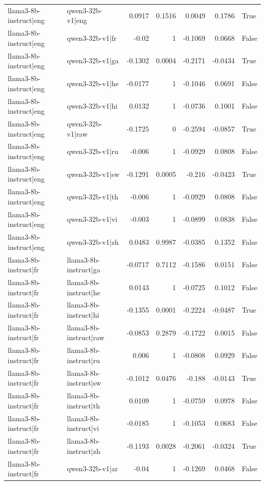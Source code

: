 \begin{table}
\begin{tabular}{l l r r r r l}
llama3-8b-instruct|eng & qwen3-32b-v1|eng & 0.0917 & 0.1516 & 0.0049 & 0.1786 & True \\
llama3-8b-instruct|eng & qwen3-32b-v1|fr & -0.02 & 1 & -0.1069 & 0.0668 & False \\
llama3-8b-instruct|eng & qwen3-32b-v1|ga & -0.1302 & 0.0004 & -0.2171 & -0.0434 & True \\
llama3-8b-instruct|eng & qwen3-32b-v1|he & -0.0177 & 1 & -0.1046 & 0.0691 & False \\
llama3-8b-instruct|eng & qwen3-32b-v1|hi & 0.0132 & 1 & -0.0736 & 0.1001 & False \\
llama3-8b-instruct|eng & qwen3-32b-v1|raw & -0.1725 & 0 & -0.2594 & -0.0857 & True \\
llama3-8b-instruct|eng & qwen3-32b-v1|ru & -0.006 & 1 & -0.0929 & 0.0808 & False \\
llama3-8b-instruct|eng & qwen3-32b-v1|sw & -0.1291 & 0.0005 & -0.216 & -0.0423 & True \\
llama3-8b-instruct|eng & qwen3-32b-v1|th & -0.006 & 1 & -0.0929 & 0.0808 & False \\
llama3-8b-instruct|eng & qwen3-32b-v1|vi & -0.003 & 1 & -0.0899 & 0.0838 & False \\
llama3-8b-instruct|eng & qwen3-32b-v1|zh & 0.0483 & 0.9987 & -0.0385 & 0.1352 & False \\
llama3-8b-instruct|fr & llama3-8b-instruct|ga & -0.0717 & 0.7112 & -0.1586 & 0.0151 & False \\
llama3-8b-instruct|fr & llama3-8b-instruct|he & 0.0143 & 1 & -0.0725 & 0.1012 & False \\
llama3-8b-instruct|fr & llama3-8b-instruct|hi & -0.1355 & 0.0001 & -0.2224 & -0.0487 & True \\
llama3-8b-instruct|fr & llama3-8b-instruct|raw & -0.0853 & 0.2879 & -0.1722 & 0.0015 & False \\
llama3-8b-instruct|fr & llama3-8b-instruct|ru & 0.006 & 1 & -0.0808 & 0.0929 & False \\
llama3-8b-instruct|fr & llama3-8b-instruct|sw & -0.1012 & 0.0476 & -0.188 & -0.0143 & True \\
llama3-8b-instruct|fr & llama3-8b-instruct|th & 0.0109 & 1 & -0.0759 & 0.0978 & False \\
llama3-8b-instruct|fr & llama3-8b-instruct|vi & -0.0185 & 1 & -0.1053 & 0.0683 & False \\
llama3-8b-instruct|fr & llama3-8b-instruct|zh & -0.1193 & 0.0028 & -0.2061 & -0.0324 & True \\
llama3-8b-instruct|fr & qwen3-32b-v1|ar & -0.04 & 1 & -0.1269 & 0.0468 & False \\

\end{tabular}
\end{table}
